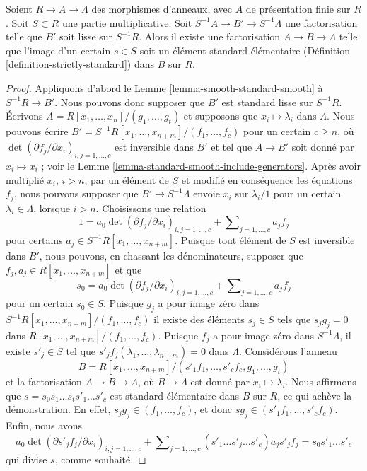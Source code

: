 \begin{lemma}
\label{lemma-delocalize-base}
Soient $R \to A \to \Lambda$ des morphismes d'anneaux, avec $A$ de présentation finie
sur $R$. Soit $S \subset R$ une partie
multiplicative. Soit $S^{-1}A \to B' \to S^{-1}\Lambda$ une factorisation telle que
$B'$ soit lisse sur $S^{-1}R$. Alors il existe une factorisation
$A \to B \to \Lambda$ telle que l'image d'un certain $s \in S$ soit un
élément standard élémentaire (Définition \ref{definition-strictly-standard})
dans $B$ sur $R$.
\end{lemma}

\begin{proof}
Appliquons d'abord le Lemme \ref{lemma-smooth-standard-smooth} à $S^{-1}R \to B'$.
Nous pouvons donc supposer que $B'$ est standard lisse sur $S^{-1}R$.
Écrivons $A = R[x_1, \ldots, x_n]/(g_1, \ldots, g_t)$ et supposons que
$x_i \mapsto \lambda_i$ dans $\Lambda$. Nous pouvons écrire
$B' = S^{-1}R[x_1, \ldots, x_{n + m}]/(f_1, \ldots, f_c)$
pour un certain $c \geq n$, où
$\det(\partial f_j/\partial x_i)_{i, j = 1, \ldots, c}$
est inversible dans $B'$ et tel que $A \to B'$ soit donné par $x_i \mapsto x_i$ ;
voir le Lemme \ref{lemma-standard-smooth-include-generators}.
Après avoir multiplié $x_i$, $i > n$, par un élément de $S$ et modifié en conséquence
les équations $f_j$, nous pouvons supposer que $B' \to S^{-1}\Lambda$ envoie
$x_i$ sur $\lambda_i/1$ pour un certain $\lambda_i \in \Lambda$, lorsque $i > n$.
Choisissons une relation
$$
1 =
a_0 \det(\partial f_j/\partial x_i)_{i, j = 1, \ldots, c}
+
\sum\nolimits_{j = 1, \ldots, c} a_jf_j
$$
pour certains $a_j \in S^{-1}R[x_1, \ldots, x_{n + m}]$. Puisque tout élément de $S$
est inversible dans $B'$, nous pouvons, en chassant les dénominateurs, supposer que
$f_j, a_j \in R[x_1, \ldots, x_{n + m}]$ et que
$$
s_0 = a_0 \det(\partial f_j/\partial x_i)_{i, j = 1, \ldots, c}
+
\sum\nolimits_{j = 1, \ldots, c} a_jf_j
$$
pour un certain $s_0 \in S$. Puisque $g_j$ a pour image zéro dans
$S^{-1}R[x_1, \ldots, x_{n + m}]/(f_1, \ldots, f_c)$
il existe des éléments $s_j \in S$ tels que $s_j g_j = 0$ dans
$R[x_1, \ldots, x_{n + m}]/(f_1, \ldots, f_c)$.
Puisque $f_j$ a pour image zéro dans $S^{-1}\Lambda$, il existe $s'_j \in S$
tel que $s'_j f_j(\lambda_1, \ldots, \lambda_{n + m}) = 0$ dans
$\Lambda$. Considérons l'anneau
$$
B = R[x_1, \ldots, x_{n + m}]/
(s'_1f_1, \ldots, s'_cf_c, g_1, \ldots, g_t)
$$
et la factorisation $A \to B \to \Lambda$, où $B \to \Lambda$ est donné par
$x_i \mapsto \lambda_i$. Nous affirmons que $s = s_0s_1 \ldots s_ts'_1 \ldots s'_c$
est standard élémentaire dans $B$ sur $R$, ce qui achève la démonstration.
En effet, $s_j g_j \in (f_1, \ldots, f_c)$, et donc
$sg_j \in (s'_1f_1, \ldots, s'_cf_c)$. Enfin, nous avons
$$
a_0\det(\partial s'_jf_j/\partial x_i)_{i, j = 1, \ldots, c}
+
\sum\nolimits_{j = 1, \ldots, c}
(s'_1 \ldots \hat{s'_j} \ldots s'_c) a_j s'_jf_j
=
s_0s'_1\ldots s'_c
$$
qui divise $s$, comme souhaité.
\end{proof}


